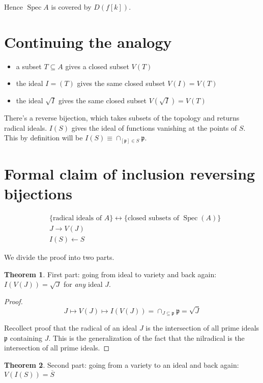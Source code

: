 \documentclass{book}
\newcommand{\spec}{\operatorname{Spec}}
\newcommand{\p}{\mathfrak{p}}
\theoremstyle{definition}
\newtheorem{theorem}{Theorem}
\begin{document}
Hence $\spec A$ is covered by $D(f[k])$.

\section{Continuing the analogy}
\begin{itemize}
    \item a subset $T \subseteq A$ gives a closed subset $V(T)$
    \item the ideal $I = (T)$ gives the same closed subset $V(I) = V(T)$
    \item the ideal $\sqrt I$ gives the same closed subset $V(\sqrt I) = V(T)$
\end{itemize}

There's a reverse bijection, which takes subsets of the topology and returns
radical ideals. $I(S)$ gives the ideal of functions vanishing at the points of $S$.
This by definition will be $I(S) \equiv \cap_{[\p] \in S} \p$.

\section{Formal claim of inclusion reversing bijections}

\begin{align*}
&\{ \text{radical ideals of $A$} \} \leftrightarrow \{ \text{closed subsets of $\spec(A)$} \} \\
&J \rightarrow V(J) \\
&I(S) \leftarrow S
\end{align*}

We divide the proof into two parts.

\begin{theorem}
First part: going from ideal to variety and back again:
$I(V(J)) = \sqrt{J}$ for \emph{any} ideal $J$.
\end{theorem}
\begin{proof}
$$
J \mapsto V(J) \mapsto I(V(J)) = \cap_{J \subseteq \p} \p = \sqrt{J}
$$

Recollect proof that the radical of an ideal $J$ is the intersection of all prime
ideals $\p$ containing $J$. This is the generalization of the fact that the
nilradical is the intersection of all prime ideals.
\end{proof}

\begin{theorem}
Second part: going from a variety to an ideal and back again:
$V(I(S)) = \overline{S}$
\end{theorem}
\end{document}
